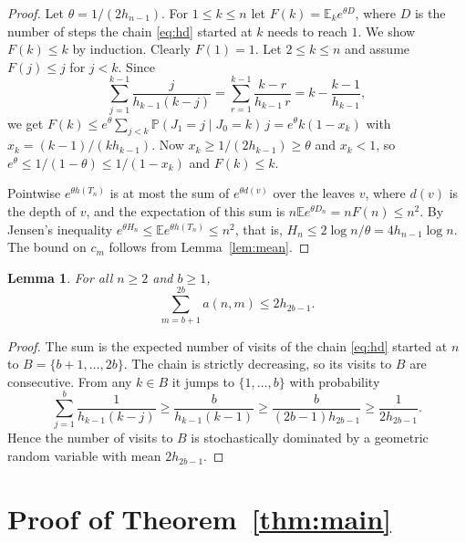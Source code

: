\documentclass[11pt]{amsart}
\newtheorem{lemma}[theorem]{Lemma}
\theoremstyle{remark}
\numberwithin{equation}{section}
\newcommand{\E}{\mathbb E}
\newcommand{\Pp}{\mathbb P}
\begin{document}
\begin{proof}
Let $\theta=1/(2h_{n-1})$. For $1\le k\le n$ let $F(k)=\E_k e^{\theta D}$, where $D$ is the number of steps the chain \eqref{eq:hd} started at $k$ needs to reach $1$. We show $F(k)\le k$ by induction. Clearly $F(1)=1$. Let $2\le k\le n$ and assume $F(j)\le j$ for $j<k$. Since
\[
 \sum_{j=1}^{k-1}\frac{j}{h_{k-1}(k-j)}=\sum_{r=1}^{k-1}\frac{k-r}{h_{k-1}\,r}=k-\frac{k-1}{h_{k-1}},
\]
we get $F(k)\le e^\theta\sum_{j<k}\Pp(J_1=j\mid J_0=k)\,j=e^\theta k(1-x_k)$ with $x_k=(k-1)/(kh_{k-1})$. Now $x_k\ge1/(2h_{k-1})\ge\theta$ and $x_k<1$, so $e^\theta\le1/(1-\theta)\le1/(1-x_k)$ and $F(k)\le k$.

Pointwise $e^{\theta h(T_n)}$ is at most the sum of $e^{\theta d(v)}$ over the leaves $v$, where $d(v)$ is the depth of $v$, and the expectation of this sum is $n\E e^{\theta D_n}=nF(n)\le n^2$. By Jensen's inequality $e^{\theta H_n}\le\E e^{\theta h(T_n)}\le n^2$, that is, $H_n\le2\log n/\theta=4h_{n-1}\log n$. The bound on $c_m$ follows from Lemma~\ref{lem:mean}.
\end{proof}

\begin{lemma}\label{lem:block}
For all $n\ge2$ and $b\ge1$,
\[
 \sum_{m=b+1}^{2b}a(n,m)\le2h_{2b-1}.
\]
\end{lemma}

\begin{proof}
The sum is the expected number of visits of the chain \eqref{eq:hd} started at $n$ to $B=\{b+1,\dots,2b\}$. The chain is strictly decreasing, so its visits to $B$ are consecutive. From any $k\in B$ it jumps to $\{1,\dots,b\}$ with probability
\[
 \sum_{j=1}^b\frac1{h_{k-1}(k-j)}\ge\frac{b}{h_{k-1}(k-1)}\ge\frac{b}{(2b-1)h_{2b-1}}\ge\frac1{2h_{2b-1}}.
\]
Hence the number of visits to $B$ is stochastically dominated by a geometric random variable with mean $2h_{2b-1}$.
\end{proof}

\section{Proof of Theorem~\ref{thm:main}}\label{sec:proof}
\end{document}
